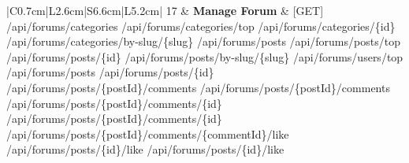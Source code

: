 \begin{longtable}{|C{0.7cm}|L{2.6cm}|S{6.6cm}|L{5.2cm}|}
17
&
\textbf{Manage Forum}
&
[GET] /\allowbreak{}api/\allowbreak{}forums/\allowbreak{}categories \newline
[GET] /\allowbreak{}api/\allowbreak{}forums/\allowbreak{}categories/\allowbreak{}top \newline
[GET] /\allowbreak{}api/\allowbreak{}forums/\allowbreak{}categories/\allowbreak{}\{id\} \newline
[GET] /\allowbreak{}api/\allowbreak{}forums/\allowbreak{}categories/\allowbreak{}by-slug/\allowbreak{}\{slug\} \newline
[GET] /\allowbreak{}api/\allowbreak{}forums/\allowbreak{}posts \newline
[GET] /\allowbreak{}api/\allowbreak{}forums/\allowbreak{}posts/\allowbreak{}top \newline
[GET] /\allowbreak{}api/\allowbreak{}forums/\allowbreak{}posts/\allowbreak{}\{id\} \newline
[GET] /\allowbreak{}api/\allowbreak{}forums/\allowbreak{}posts/\allowbreak{}by-slug/\allowbreak{}\{slug\} \newline
[GET] /\allowbreak{}api/\allowbreak{}forums/\allowbreak{}users/\allowbreak{}top \newline
[POST] /\allowbreak{}api/\allowbreak{}forums/\allowbreak{}posts \newline
[DELETE] /\allowbreak{}api/\allowbreak{}forums/\allowbreak{}posts/\allowbreak{}\{id\} \newline
[GET] /\allowbreak{}api/\allowbreak{}forums/\allowbreak{}posts/\allowbreak{}\{postId\}/\allowbreak{}comments \newline
[POST] /\allowbreak{}api/\allowbreak{}forums/\allowbreak{}posts/\allowbreak{}\{postId\}/\allowbreak{}comments \newline
[PATCH] /\allowbreak{}api/\allowbreak{}forums/\allowbreak{}posts/\allowbreak{}\{postId\}/\allowbreak{}comments/\allowbreak{}\{id\} \newline
[DELETE] /\allowbreak{}api/\allowbreak{}forums/\allowbreak{}posts/\allowbreak{}\{postId\}/\allowbreak{}comments/\allowbreak{}\{id\} \newline
[POST] /\allowbreak{}api/\allowbreak{}forums/\allowbreak{}posts/\allowbreak{}\{postId\}/\allowbreak{}comments/\allowbreak{}\{commentId\}/\allowbreak{}like \newline
[POST] /\allowbreak{}api/\allowbreak{}forums/\allowbreak{}posts/\allowbreak{}\{id\}/\allowbreak{}like \newline
[GET] /\allowbreak{}api/\allowbreak{}forums/\allowbreak{}posts/\allowbreak{}\{id\}/\allowbreak{}like \newline

\end{longtable}
